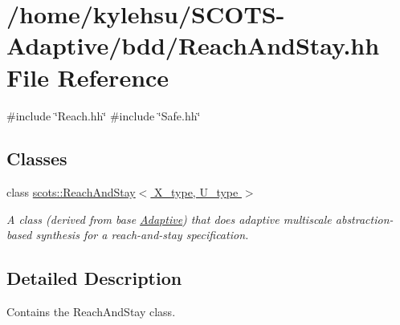 \hypertarget{ReachAndStay_8hh}{}\section{/home/kylehsu/\+S\+C\+O\+T\+S-\/\+Adaptive/bdd/\+Reach\+And\+Stay.hh File Reference}
\label{ReachAndStay_8hh}
{\ttfamily \#include \char`\"{}Reach.\+hh\char`\"{}}\newline
{\ttfamily \#include \char`\"{}Safe.\+hh\char`\"{}}\newline
\subsection*{Classes}
\begin{DoxyCompactItemize}
\item 
class \hyperlink{classscots_1_1ReachAndStay}{scots\+::\+Reach\+And\+Stay$<$ X\+\_\+type, U\+\_\+type $>$}
\begin{DoxyCompactList}\small\item\em A class (derived from base \hyperlink{classscots_1_1Adaptive}{Adaptive}) that does adaptive multiscale abstraction-\/based synthesis for a reach-\/and-\/stay specification. \end{DoxyCompactList}\end{DoxyCompactItemize}


\subsection{Detailed Description}
Contains the Reach\+And\+Stay class. 
